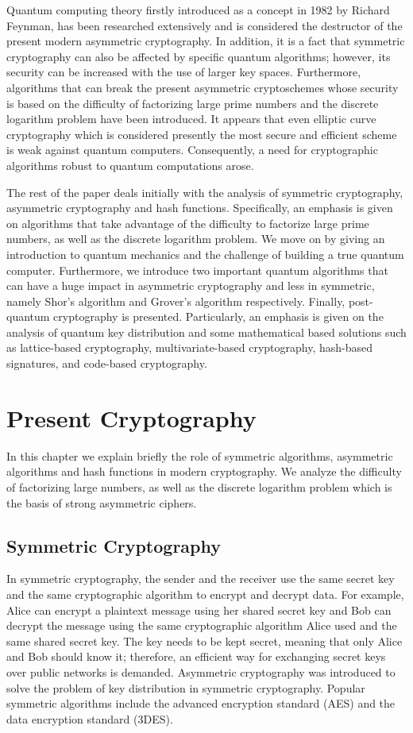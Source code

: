 \documentclass[conference, letterpaper]{IEEEtran}
\begin{document}
Quantum computing theory firstly introduced as a concept in 1982 by Richard Feynman, has been researched extensively and is considered the destructor of the present modern asymmetric cryptography. In addition, it is a fact that symmetric cryptography can also be affected by specific quantum algorithms; however, its security can be increased with the use of larger key spaces. Furthermore, algorithms that can break the present asymmetric cryptoschemes whose security is based on the difficulty of factorizing large prime numbers and the discrete logarithm problem have been introduced. It appears that even elliptic curve cryptography which is considered presently the most secure and efficient scheme is weak against quantum computers. Consequently, a need for cryptographic algorithms robust to quantum computations arose.

The rest of the paper deals initially with the analysis of symmetric cryptography, asymmetric cryptography and hash functions. Specifically, an emphasis is given on algorithms that take advantage of the difficulty to factorize large prime numbers, as well as the discrete logarithm problem. We move on by giving an introduction to quantum mechanics and the challenge of building a true quantum computer. Furthermore, we introduce two important quantum algorithms that can have a huge impact in asymmetric cryptography and less in symmetric, namely Shor's algorithm and Grover's algorithm respectively. Finally, post-quantum cryptography is presented. Particularly, an emphasis is given on the analysis of quantum key distribution and some mathematical based solutions such as lattice-based cryptography, multivariate-based cryptography, hash-based signatures, and code-based cryptography.

\section{Present Cryptography}
In this chapter we explain briefly the role of symmetric algorithms, asymmetric algorithms and hash functions in modern cryptography. We analyze the difficulty of factorizing large numbers, as well as the discrete logarithm problem which is the basis of strong asymmetric ciphers.

\subsection{Symmetric Cryptography}
In symmetric cryptography, the sender and the receiver use the same secret key and the same cryptographic algorithm to encrypt and decrypt data. For example, Alice can encrypt a plaintext message using her shared secret key and Bob can decrypt the message using the same cryptographic algorithm Alice used and the same shared secret key. The key needs to be kept secret, meaning that only Alice and Bob should know it; therefore, an efficient way for exchanging secret keys over public networks is demanded. Asymmetric cryptography was introduced to solve the problem of key distribution in symmetric cryptography. Popular symmetric algorithms include the advanced encryption standard (AES) and the data encryption standard (3DES). 
\end{document}
